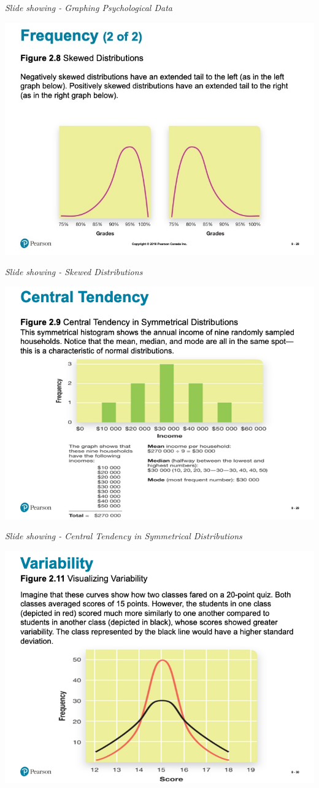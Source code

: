 \documentclass[
]{book}
\begin{document}
\begin{reflect}
\emph{Slide showing - Graphing Psychological Data}

\includegraphics{assets/unit_1/slide_28.jpg}

\emph{Slide showing - Skewed Distributions}

\includegraphics{assets/unit_1/slide_29.png}

\emph{Slide showing - Central Tendency in Symmetrical Distributions}

\includegraphics{assets/unit_1/slide_30.png}


\end{reflect}
\end{document}
